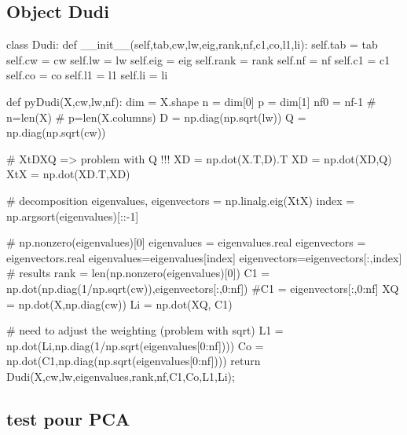 \documentclass[
  10pt,
]{article}
\newenvironment{Shaded}{\begin{snugshade}}{\end{snugshade}}
\newcommand{\NormalTok}[1]{#1}
\begin{document}
\subsection{\texorpdfstring{Object
\textbf{Dudi}}{Object Dudi}}\label{object-dudi}

\begin{Shaded}
\begin{Highlighting}[]
\NormalTok{class Dudi:}
\NormalTok{  def \_\_init\_\_(self,tab,cw,lw,eig,rank,nf,c1,co,l1,li):}
\NormalTok{    self.tab = tab}
\NormalTok{    self.cw = cw}
\NormalTok{    self.lw = lw}
\NormalTok{    self.eig = eig}
\NormalTok{    self.rank = rank}
\NormalTok{    self.nf = nf}
\NormalTok{    self.c1 = c1}
\NormalTok{    self.co = co}
\NormalTok{    self.l1 = l1}
\NormalTok{    self.li = li}

\NormalTok{def pyDudi(X,cw,lw,nf):}
\NormalTok{  dim = X.shape}
\NormalTok{  n = dim[0]}
\NormalTok{  p = dim[1]}
\NormalTok{  nf0 = nf{-}1}
\NormalTok{  \# n=len(X)}
\NormalTok{  \# p=len(X.columns)}
\NormalTok{  D = np.diag(np.sqrt(lw))}
\NormalTok{  Q = np.diag(np.sqrt(cw))}
  
\NormalTok{  \# XtDXQ =\textgreater{} problem  with Q !!!}
\NormalTok{  XD = np.dot(X.T,D).T}
\NormalTok{  XD = np.dot(XD,Q)}
\NormalTok{  XtX = np.dot(XD.T,XD)}
  
\NormalTok{  \# decomposition}
\NormalTok{  eigenvalues, eigenvectors = np.linalg.eig(XtX)}
\NormalTok{  index = np.argsort(eigenvalues)[::{-}1]}
  
\NormalTok{  \# np.nonzero(eigenvalues)[0]}
\NormalTok{  eigenvalues = eigenvalues.real}
\NormalTok{  eigenvectors = eigenvectors.real}
\NormalTok{  eigenvalues=eigenvalues[index]}
\NormalTok{  eigenvectors=eigenvectors[:,index]}
\NormalTok{  \# results}
\NormalTok{  rank = len(np.nonzero(eigenvalues)[0])}
\NormalTok{  C1 = np.dot(np.diag(1/np.sqrt(cw)),eigenvectors[:,0:nf])}
\NormalTok{  \#C1 = eigenvectors[:,0:nf]}
\NormalTok{  XQ = np.dot(X,np.diag(cw))}
\NormalTok{  Li = np.dot(XQ, C1)}
  
\NormalTok{  \# need to adjust the weighting (problem with sqrt)}
\NormalTok{  L1 = np.dot(Li,np.diag(1/np.sqrt(eigenvalues[0:nf])))}
\NormalTok{  Co = np.dot(C1,np.diag(np.sqrt(eigenvalues[0:nf])))}
\NormalTok{  return Dudi(X,cw,lw,eigenvalues,rank,nf,C1,Co,L1,Li);}
\end{Highlighting}
\end{Shaded}

\subsection{test pour PCA}\label{test-pour-pca}
\end{document}
